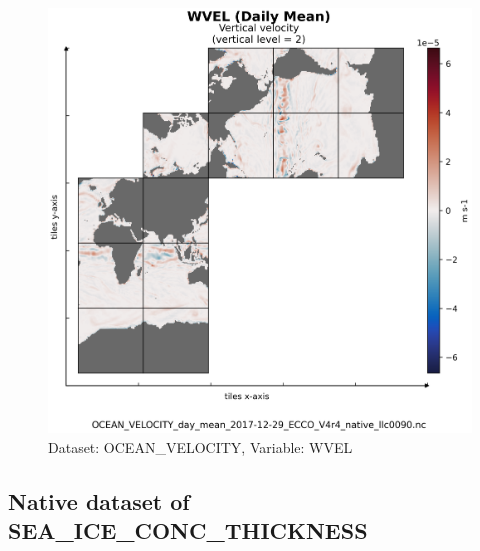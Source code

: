 \begin{figure}[H]
\centering
\includegraphics[scale=0.55]{../images/plots/v4r4/native_plots/Ocean_Velocity/WVEL.png}
\caption{Dataset: OCEAN\_VELOCITY, Variable: WVEL}
\label{tab:table-OCEAN_VELOCITY_WVEL-Plot}
\end{figure}
\newpage
\subsection{Native dataset of SEA\_ICE\_CONC\_THICKNESS}
\newp
